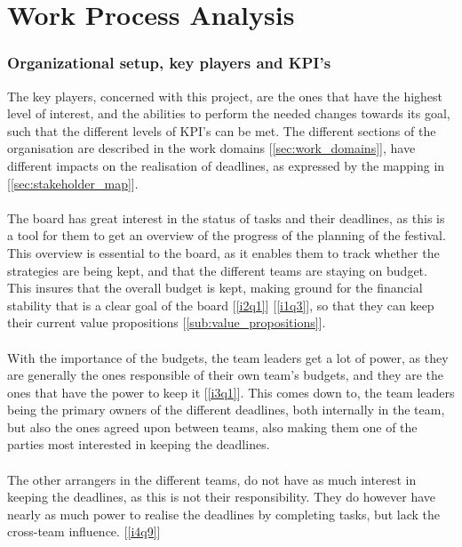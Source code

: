 \part{Work Process Analysis}
\label{prt:in_depth_analysis}
\section{Organizational setup, key players and KPI's}
The key players, concerned with this project, are the ones that have the highest
level of interest, and the abilities to perform the needed changes towards its
goal, such that the different levels of KPI's can be met. The different sections
of the organisation are described in the work domains [\ref{sec:work_domains}], have different impacts on the realisation of deadlines, as expressed by the mapping in [\ref{sec:stakeholder_map}].
\\ \\
The board has great interest in the status of tasks and their deadlines, as this
is a tool for them to get an overview of the progress of the planning of the
festival. This overview is essential to the board, as it enables them to track
whether the strategies are being kept, and that the different teams are staying
on budget. This insures that the overall budget is kept, making ground for the financial stability that is a clear goal of the board [\ref{i2q1}] [\ref{i1q3}], so that they can keep their current value propositions [\ref{sub:value_propositions}].
\\ \\
With the importance of the budgets, the team leaders get a lot of power, as they
are generally the ones responsible of their own team's budgets, and they are the ones that have the power to keep it [\ref{i3q1}]. This comes down to, the team leaders being the primary owners of the different deadlines, both internally in the team, but also the ones agreed upon between teams, also making them one of the parties most interested in keeping the deadlines.
\\ \\
The other arrangers in the different teams, do not have as much interest in keeping the deadlines, as this is not their responsibility. They do however have nearly as much power to realise the deadlines by completing tasks, but lack the cross-team influence. [\ref{i4q9}]


